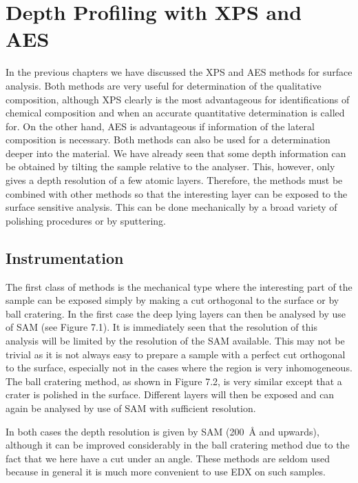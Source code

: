 \chapter{Depth Profiling with XPS and AES}
In the previous chapters we have discussed the XPS and AES methods for surface analysis. Both methods are very useful for determination of the qualitative composition, although XPS clearly is the most advantageous for identifications of chemical composition and when an accurate quantitative determination is called for. On the other hand, AES is advantageous if information of the lateral composition is necessary. Both methods can also be used for a determination deeper into the material. We have already seen that some depth information can be obtained by tilting the sample relative to the analyser. This, however, only gives a depth resolution of a few atomic layers. Therefore, the methods must be combined with other methods so that the interesting layer can be exposed to the surface sensitive analysis. This can be done mechanically by a broad variety of polishing procedures or by sputtering.

\section{Instrumentation}
The first class of methods is the mechanical type where the interesting part of the sample can be exposed simply by making a cut orthogonal to the surface or by ball cratering. In the first case the deep lying layers can then be analysed by use of SAM (see Figure 7.1). It is immediately seen that the resolution of this analysis will be limited by the resolution of the SAM available. This may not be trivial as it is not always easy to prepare a sample with a perfect cut orthogonal to the surface, especially not in the cases where the region is very inhomogeneous. The ball cratering method, as shown in Figure 7.2, is very similar except that a crater is polished in the surface. Different layers will then be exposed and can again be analysed by use of SAM with sufficient resolution.

In both cases the depth resolution is given by SAM (\SI{200}{\angstrom} and upwards), although it can be improved considerably in the ball cratering method due to the fact that we here have a cut under an angle. These methods are seldom used because in general it is much more convenient to use EDX on such samples.\\

 \vspace{1cm}

